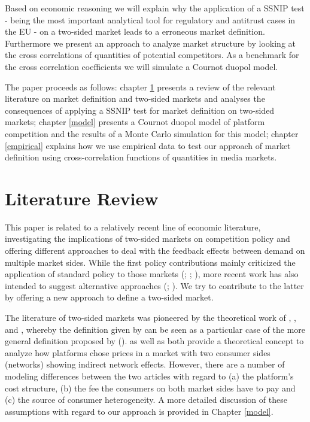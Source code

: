 \documentclass[12pt,a4paper]{scrreprt}
\begin{document}
Based on economic reasoning we will explain why the application of a SSNIP test - being the most important analytical tool for regulatory and antitrust cases in the EU - on a two-sided market leads to a erroneous market definition. Furthermore we present an approach to analyze market structure by looking at the cross correlations of quantities of potential competitors. As a benchmark for the cross correlation coefficients we will simulate a Cournot duopol model. 

The paper proceeds as follows: chapter \ref{litrev} presents a review of the relevant literature on market definition and two-sided markets and analyses the consequences of applying a SSNIP test for market definition on two-sided markets; chapter \ref{model} presents a Cournot duopol model of platform competition and the results of a Monte Carlo simulation for this model; chapter \ref{empirical}  explains how we use empirical data to test our approach of market definition using cross-correlation functions of quantities in media markets.  


\chapter{Literature Review}\label{litrev}
This paper is related to a relatively recent line of economic literature, investigating the implications of two-sided markets on competition policy and offering different approaches to deal with the feedback effects between demand on multiple market sides. While the first policy contributions mainly criticized the application of standard policy to those markets (\cite{wright_one-sided_2004}; \cite{leonello_horizontal_2010}; \cite{chandra_mergers_2009}), more recent work has also intended to suggest alternative approaches (\cite{argentesi_estimating_2007}; \cite{song_estimating_2015}). We try to contribute to the latter by offering a new approach to define a two-sided market. 

The literature of two-sided markets was pioneered by the theoretical work of \cite{caillaud_chicken_2003}, \cite{rochet_platform_2003}, \cite{evans_antitrust_2003} and \cite{armstrong_competition_2006}, whereby the definition given by \cite{evans_antitrust_2003} can be seen as a particular case of the more general definition proposed by \cite{rochet_platform_2003} (\cite{filistrucchi_identifying_2012}). \cite{rochet_platform_2003} as well as \cite{armstrong_competition_2006} both provide a theoretical concept to analyze how platforms chose prices in a market with two consumer sides (networks) showing indirect network effects. However, there are a number of modeling differences between the two articles with regard to (a) the platform's cost structure, (b) the fee the consumers on both market sides have to pay and (c) the source of consumer heterogeneity. A more detailed discussion of these assumptions with regard to our approach is provided in Chapter \ref{model}.  
\end{document}
